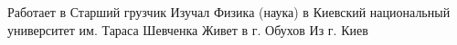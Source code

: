  
 
 
 
 

\par
Работает в Старший грузчик
Изучал Физика (наука) в Киевский национальный университет им. Тараса Шевченка
Живет в г. Обухов
Из г. Киев


